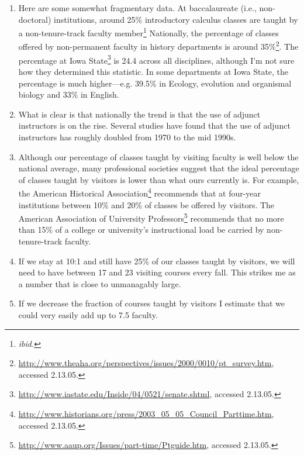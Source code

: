 \documentclass[12pt]{article}
\begin{document}
\begin{enumerate}
    \item Here are some somewhat fragmentary data.  At baccalaureate
     (i.e., non-doctoral) institutions, around 25\%
     introductory calculus classes are taught by a non-tenure-track
     faculty member\footnote{{\em ibid.}}  Nationally, the
     percentage of classes offered by non-permanent faculty in history
     departments is around 35\%\footnote{
     {\url{http://www.theaha.org/perspectives/issues/2000/0010/pt_survey.htm}},
     accessed 2.13.05.}.  
     The percentage at Iowa
     State\footnote{
     {\url{http://www.iastate.edu/Inside/04/0521/senate.shtml}},
     accessed 2.13.05.} is 24.4 across all disciplines, although I'm
     not sure how they 
     determined this statistic.  In some departments at Iowa State,
     the percentage is much higher---e.g. 39.5\% in Ecology, evolution
     and organismal biology and 33\% in English. 

     \item What is clear is that nationally the trend is that the use
     of adjunct instructors is on the rise.  Several studies have
     found that the use of adjunct instructors has roughly doubled from
     1970 to the mid 1990s. 

     \item Although our percentage of classes taught by visiting
     faculty is well below the national average, many professional
     societies suggest that the ideal percentage of classes taught by
     visitors is lower than what ours currently is.  For example, 
     the American Historical Association\footnote{
     {\url{http://www.historians.org/press/2003_05_05_Council_Parttime.htm}},
     accessed 2.13.05.} recommends that at four-year institutions
     between 10\% and 20\% of classes be offered by visitors.  The
     American Association of University Professors\footnote{
     {\url{http://www.aaup.org/Issues/part-time/Ptguide.htm}},
     accessed 2.13.05.} recommends that no more than 15\% of a college
     or university's instructional load be carried by non-tenure-track
     faculty. 


    \item If we stay at 10:1 and still have 25\% of our classes taught
    by visitors, we will need to have between 17 and 23 visiting
    courses every fall.  This strikes me as a number that is close to
    unmanagably large.  

    \item If we decrease the fraction of courses taught by visitors I
    estimate that we could very easily add up to 7.5 faculty.


\end{enumerate}
\end{document}
